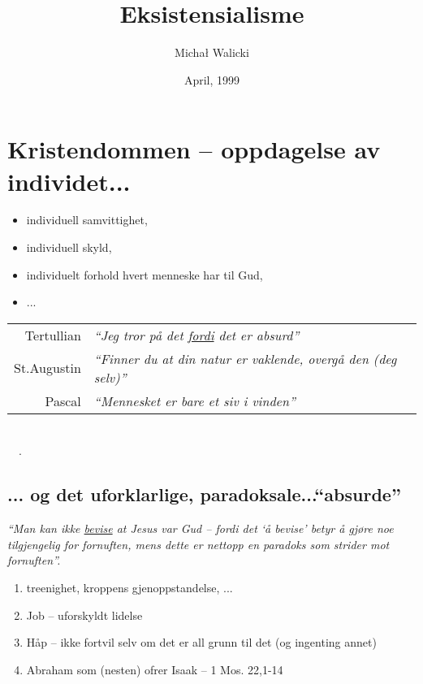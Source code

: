 \documentclass[12pt]{article}
\title{Eksistensialisme}
\author{Micha{\l} Walicki}
\date{April, 1999}
\newcommand{\citt}[1]{{\em #1}}
\newcommand{\ut}[2]{\\ \ \ .\dotfill{\small{\bf #1} vs. {\bf #2}}}
\newcommand{\und}[1]{\underline{#1}}
\begin{document}

\section{Kristendommen -- oppdagelse av individet...} 
\begin{itemize}
\item individuell samvittighet, %
\item individuell skyld,
\item individuelt forhold hvert menneske har til Gud, 
\item ...
\end{itemize}

\noindent
\begin{tabular}{r@{\ :\ \ }l}
Tertullian & \citt{``Jeg tror p{\aa} det \und{fordi} det er absurd''} \\
St.Augustin & \citt{``Finner du at din natur er vaklende, overg{\aa} den (deg
selv)''} \\
Pascal & \citt{``Mennesket er bare et siv i vinden''} 
\end{tabular}
\ut{fornuft}{tro}


\subsection*{... og det uforklarlige, paradoksale...``absurde''}
\citt{``Man kan ikke \und{bevise} at Jesus var Gud -- fordi det `{\aa} bevise'
betyr {\aa} gj{\o}re noe tilgjengelig for fornuften, mens dette er
nettopp en paradoks som strider mot fornuften''.}
\begin{enumerate}
\item treenighet, kroppens gjenoppstandelse, ...
\item Job -- uforskyldt lidelse
\item H{\aa}p -- ikke fortvil selv om det er all grunn til det (og ingenting annet)
\item Abraham som (nesten) ofrer Isaak -- 1 Mos. 22,1-14
\end{enumerate}

\newpage
\end{document}
